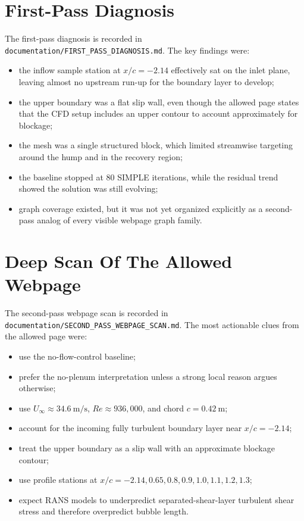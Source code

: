 \documentclass[11pt]{article}
\begin{document}
\section{First-Pass Diagnosis}
The first-pass diagnosis is recorded in \texttt{documentation/FIRST\_PASS\_DIAGNOSIS.md}. The key findings were:
\begin{itemize}
\item the inflow sample station at \(x/c=-2.14\) effectively sat on the inlet plane, leaving almost no upstream run-up for the boundary layer to develop;
\item the upper boundary was a flat slip wall, even though the allowed page states that the CFD setup includes an upper contour to account approximately for blockage;
\item the mesh was a single structured block, which limited streamwise targeting around the hump and in the recovery region;
\item the baseline stopped at 80 SIMPLE iterations, while the residual trend showed the solution was still evolving;
\item graph coverage existed, but it was not yet organized explicitly as a second-pass analog of every visible webpage graph family.
\end{itemize}

\section{Deep Scan Of The Allowed Webpage}
The second-pass webpage scan is recorded in \texttt{documentation/SECOND\_PASS\_WEBPAGE\_SCAN.md}. The most actionable clues from the allowed page were:
\begin{itemize}
\item use the no-flow-control baseline;
\item prefer the no-plenum interpretation unless a strong local reason argues otherwise;
\item use \(U_\infty \approx 34.6~\mathrm{m/s}\), \(Re \approx 936{,}000\), and chord \(c = 0.42~\mathrm{m}\);
\item account for the incoming fully turbulent boundary layer near \(x/c = -2.14\);
\item treat the upper boundary as a slip wall with an approximate blockage contour;
\item use profile stations at \(x/c = -2.14, 0.65, 0.8, 0.9, 1.0, 1.1, 1.2, 1.3\);
\item expect RANS models to underpredict separated-shear-layer turbulent shear stress and therefore overpredict bubble length.
\end{itemize}
\end{document}
